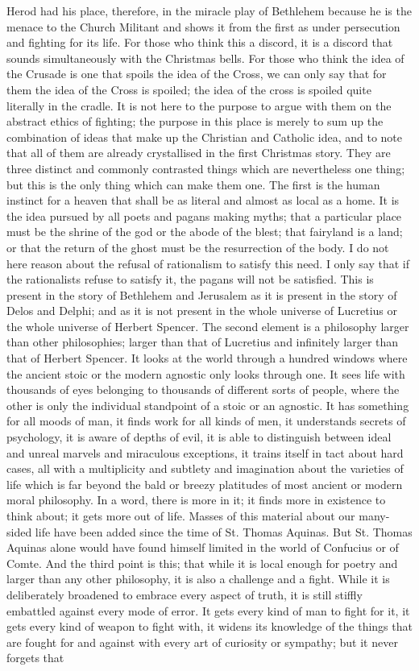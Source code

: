 Herod had his place, therefore, in the miracle play of Bethlehem because he is the menace to the Church Militant and shows it from the first as under persecution and fighting for its life. For those who think this a discord, it is a discord that sounds simultaneously with the Christmas bells. For those who think the idea of the Crusade is one that spoils the idea of the Cross, we can only say that for them the idea of the Cross is spoiled; the idea of the cross is spoiled quite literally in the cradle. It is not here to the purpose to argue with them on the abstract ethics of fighting; the purpose in this place is merely to sum up the combination of ideas that make up the Christian and Catholic idea, and to note that all of them are already crystallised in the first Christmas story. They are three distinct and commonly contrasted things which are nevertheless one thing; but this is the only thing which can make them one. The first is the human instinct for a heaven that shall be as literal and almost as local as a home. It is the idea pursued by all poets and pagans making myths; that a particular place must be the shrine of the god or the abode of the blest; that fairyland is a land; or that the return of the ghost must be the resurrection of the body. I do not here reason about the refusal of rationalism to satisfy this need. I only say that if the rationalists refuse to satisfy it, the pagans will not be satisfied. This is present in the story of Bethlehem and Jerusalem as it is present in the story of Delos and Delphi; and as it is not present in the whole universe of Lucretius or the whole universe of Herbert Spencer. The second element is a philosophy larger than other philosophies; larger than that of Lucretius and infinitely larger than that of Herbert Spencer. It looks at the world through a hundred windows where the ancient stoic or the modern agnostic only looks through one. It sees life with thousands of eyes belonging to thousands of different sorts of people, where the other is only the individual standpoint of a stoic or an agnostic. It has something for all moods of man, it finds work for all kinds of men, it understands secrets of psychology, it is aware of depths of evil, it is able to distinguish between ideal and unreal marvels and miraculous exceptions, it trains itself in tact about hard cases, all with a multiplicity and subtlety and imagination about the varieties of life which is far beyond the bald or breezy platitudes of most ancient or modern moral philosophy. In a word, there is more in it; it finds more in existence to think about; it gets more out of life. Masses of this material about our many-sided life have been added since the time of St. Thomas Aquinas. But St. Thomas Aquinas alone would have found himself limited in the world of Confucius or of Comte. And the third point is this; that while it is local enough for poetry and larger than any other philosophy, it is also a challenge and a fight. While it is deliberately broadened to embrace every aspect of truth, it is still stiffly embattled against every mode of error. It gets every kind of man to fight for it, it gets every kind of weapon to fight with, it widens its knowledge of the things that are fought for and against with every art of curiosity or sympathy; but it never forgets that 